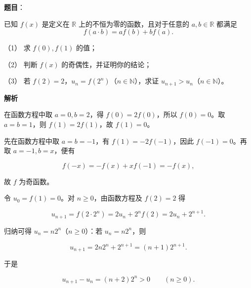 \begin{answer}

\textbf{题目}：

已知 \(f(x)\) 是定义在 \(\mathbb R\) 上的不恒为零的函数，且对于任意的 \(a,b\in\mathbb R\) 都满足
\nopagebreak[4]
\[
f(a\cdot b)=a f(b)+b f(a).
\]

（1） 求 \(f(0),f(1)\) 的值；

（2） 判断 \(f(x)\) 的奇偶性，并证明你的结论；

（3） 若 \(f(2)=2\)，\(u_n=f(2^n)\)（\(n\in\mathbb N\)），求证 \(u_{n+1}>u_n\)（\(n\in\mathbb N\)）。

\textbf{解析}


在函数方程中取 $a=0,b=2$，得 $f(0)=2f(0)$，所以 $f(0)=0$。取 $a=b=1$，则 $f(1)=2f(1)$，故 $f(1)=0$。


先在函数方程中取 $a=b=-1$，有 $f(1)=-2f(-1)$，因此 $f(-1)=0$。再取 $a=-1,b=x$，便有

\nopagebreak[4]
\[f(-x)=-f(x)+x f(-1)=-f(x),\]

故 $f$ 为奇函数。


令 $u_0=f(1)=0$。对 $n\ge0$，由函数方程及 $f(2)=2$ 得

\nopagebreak[4]
\[u_{n+1}=f(2\cdot2^n)=2u_n+2^n f(2)=2u_n+2^{n+1}.\]

归纳可得 $u_n=n2^n$（$n\ge0$）：若 $u_n=n2^n$，则

\nopagebreak[4]
\[u_{n+1}=2n2^n+2^{n+1}=(n+1)2^{n+1}.\]

于是

\nopagebreak[4]
\[u_{n+1}-u_n=(n+2)2^n>0\qquad(n\ge0).\]




\end{answer}